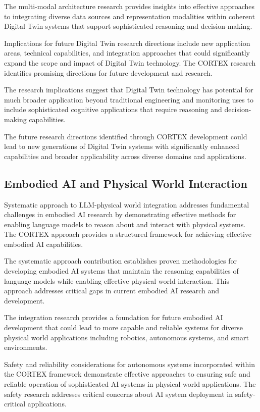 The multi-modal architecture research provides insights into effective approaches to integrating diverse data sources and representation modalities within coherent Digital Twin systems that support sophisticated reasoning and decision-making.

Implications for future Digital Twin research directions include new application areas, technical capabilities, and integration approaches that could significantly expand the scope and impact of Digital Twin technology. The CORTEX research identifies promising directions for future development and research.

The research implications suggest that Digital Twin technology has potential for much broader application beyond traditional engineering and monitoring uses to include sophisticated cognitive applications that require reasoning and decision-making capabilities.

The future research directions identified through CORTEX development could lead to new generations of Digital Twin systems with significantly enhanced capabilities and broader applicability across diverse domains and applications.

\subsection{Embodied AI and Physical World Interaction}

Systematic approach to LLM-physical world integration addresses fundamental challenges in embodied AI research by demonstrating effective methods for enabling language models to reason about and interact with physical systems. The CORTEX approach provides a structured framework for achieving effective embodied AI capabilities.

The systematic approach contribution establishes proven methodologies for developing embodied AI systems that maintain the reasoning capabilities of language models while enabling effective physical world interaction. This approach addresses critical gaps in current embodied AI research and development.

The integration research provides a foundation for future embodied AI development that could lead to more capable and reliable systems for diverse physical world applications including robotics, autonomous systems, and smart environments.

Safety and reliability considerations for autonomous systems incorporated within the CORTEX framework demonstrate effective approaches to ensuring safe and reliable operation of sophisticated AI systems in physical world applications. The safety research addresses critical concerns about AI system deployment in safety-critical applications.

